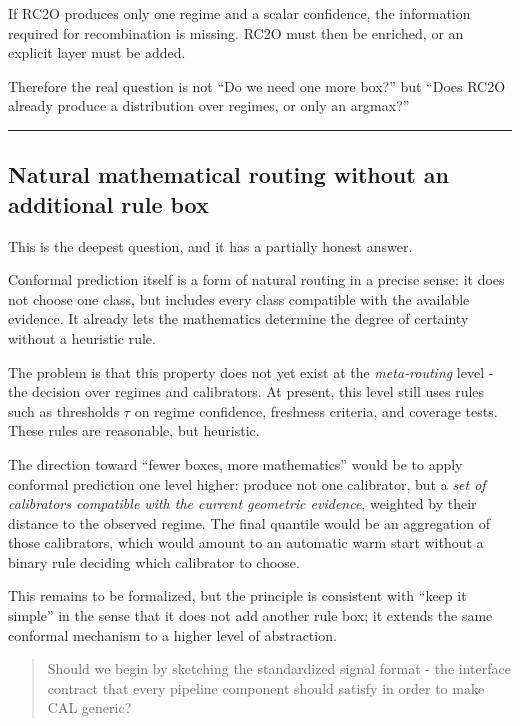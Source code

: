 If RC2O produces only one regime and a scalar confidence, the information required for recombination is missing. RC2O must then be enriched, or an explicit layer must be added.

Therefore the real question is not ``Do we need one more box?'' but ``Does RC2O already produce a distribution over regimes, or only an argmax?''

\begin{center}\rule{0.5\linewidth}{0.5pt}\end{center}

\subsection{Natural mathematical routing without an additional rule box}\label{natural-mathematical-routing-without-an-additional-rule-box}

This is the deepest question, and it has a partially honest answer.

Conformal prediction itself is a form of natural routing in a precise sense: it does not choose one class, but includes every class compatible with the available evidence. It already lets the mathematics determine the degree of certainty without a heuristic rule.

The problem is that this property does not yet exist at the \emph{meta-routing} level - the decision over regimes and calibrators. At present, this level still uses rules such as thresholds \(\tau\) on regime confidence, freshness criteria, and coverage tests. These rules are reasonable, but heuristic.

The direction toward ``fewer boxes, more mathematics'' would be to apply conformal prediction one level higher: produce not one calibrator, but a \emph{set of calibrators compatible with the current geometric evidence}, weighted by their distance to the observed regime. The final quantile would be an aggregation of those calibrators, which would amount to an automatic warm start without a binary rule deciding which calibrator to choose.

This remains to be formalized, but the principle is consistent with ``keep it simple'' in the sense that it does not add another rule box; it extends the same conformal mechanism to a higher level of abstraction.

\begin{quote}
Should we begin by sketching the standardized signal format - the interface contract that every pipeline component should satisfy in order to make CAL generic?
\end{quote}


